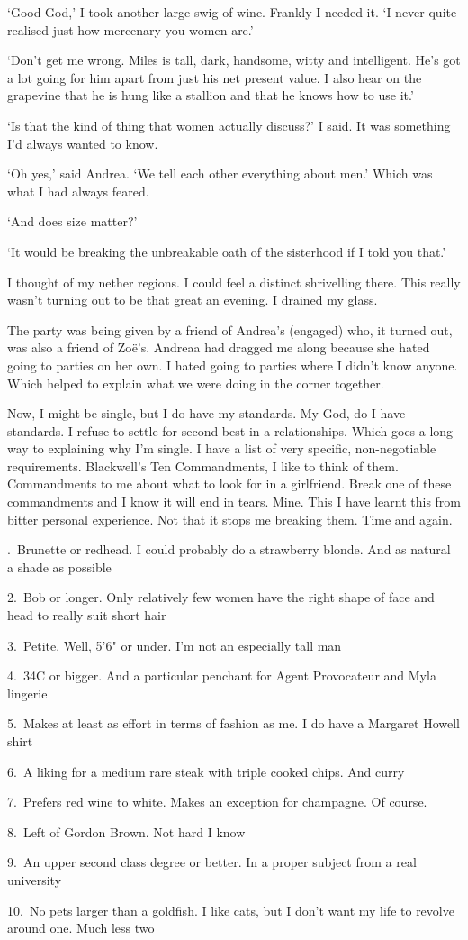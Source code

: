 `Good God,' I took another large swig of wine. Frankly I needed it.
`I never quite realised just how mercenary you women are.'

`Don't get me wrong. Miles is tall, dark, handsome,
witty and intelligent. He's got a lot going for him apart from just
his net present value. I also hear on the grapevine that he is hung
like a stallion {\twelveit and\/} that he knows how to use it.'

`Is that the kind of thing that women actually discuss?' I said. It was
something I'd always wanted to know.

`Oh yes,' said Andrea. `We tell each other {\twelveit everything\/} about
men.' Which was what I had always feared.

`And does size matter?'

`It would be breaking the unbreakable oath of the sisterhood if I told you that.'

I thought of my nether regions. I could feel
a distinct shrivelling there. This really wasn't turning out to be that great an
evening. I drained my glass.

The party was being given by a friend of Andrea's (engaged) who, it
turned out, was also a friend of Zoë's. Andreaa had dragged me
along because she hated going to parties on her own. I hated going
to parties where I didn't know anyone. Which helped to explain what
we were doing in the corner together.

Now, I might be single, but I do have my standards. My God, do I
have standards. I refuse to settle for second best in a
relationships. Which goes a long way to explaining why I'm single. I
have a list of very specific, non-negotiable requirements.
Blackwell's Ten Commandments, I like to think of them. Commandments
to me about what to look for in a girlfriend. Break one of these
commandments and I know it will end in tears. Mine. This I have
learnt this from bitter personal experience. Not that it stops me
breaking them. Time and again.

{.~Brunette or redhead. I could probably do a strawberry blonde. And as natural a shade as
possible

2.~Bob or longer. Only relatively few women have the right shape of
face and head to really suit short hair

3.~Petite. Well, 5'6" or under. I'm not an especially tall man

4.~34C or bigger. And a particular penchant for Agent Provocateur and
Myla lingerie

5.~Makes at least as effort in terms of fashion as me. I do
have a Margaret Howell shirt

6.~A liking for a medium rare steak with triple cooked chips. And curry

7.~Prefers red wine to white. Makes an exception for champagne. Of course.

8.~Left of Gordon Brown. Not hard I know

9.~An upper second class degree or better. In a proper subject from a
real university

10.~No pets larger than a goldfish. I like cats, but I don't want my
life to revolve around one. Much less two}

